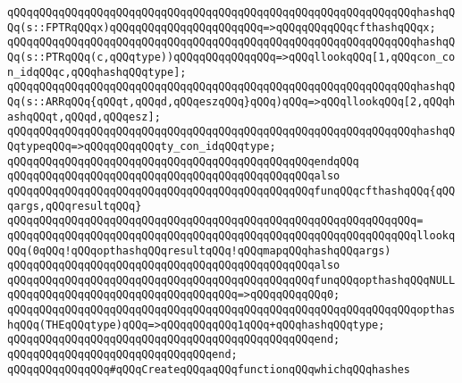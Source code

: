 \newline
\verb|qQQqqQQqqQQqqQQqqQQqqQQqqQQqqQQqqQQqqQQqqQQqqQQqqQQqqQQqqQQqqQQqhashqQQq(s::FPTRqQQqx)qQQqqQQqqQQqqQQqqQQqqQQq=>qQQqqQQqqQQqcfthashqQQqx;|\newline
\newline
\verb|qQQqqQQqqQQqqQQqqQQqqQQqqQQqqQQqqQQqqQQqqQQqqQQqqQQqqQQqqQQqqQQqhashqQQq(s::PTRqQQq(c,qQQqtype))qQQqqQQqqQQqqQQq=>qQQqllookqQQq[1,qQQqcon_con_idqQQqc,qQQqhashqQQqtype];|\newline
\verb|qQQqqQQqqQQqqQQqqQQqqQQqqQQqqQQqqQQqqQQqqQQqqQQqqQQqqQQqqQQqqQQqhashqQQq(s::ARRqQQq{qQQqt,qQQqd,qQQqeszqQQq}qQQq)qQQq=>qQQqllookqQQq[2,qQQqhashqQQqt,qQQqd,qQQqesz];|\newline
\newline
\verb|qQQqqQQqqQQqqQQqqQQqqQQqqQQqqQQqqQQqqQQqqQQqqQQqqQQqqQQqqQQqqQQqhashqQQqtypeqQQq=>qQQqqQQqqQQqty_con_idqQQqtype;|\newline
\verb|qQQqqQQqqQQqqQQqqQQqqQQqqQQqqQQqqQQqqQQqqQQqqQQqendqQQq|\newline
\newline
\verb|qQQqqQQqqQQqqQQqqQQqqQQqqQQqqQQqqQQqqQQqqQQqqQQqalso|\newline
\verb|qQQqqQQqqQQqqQQqqQQqqQQqqQQqqQQqqQQqqQQqqQQqqQQqfunqQQqcfthashqQQq{qQQqargs,qQQqresultqQQq}|\newline
\verb|qQQqqQQqqQQqqQQqqQQqqQQqqQQqqQQqqQQqqQQqqQQqqQQqqQQqqQQqqQQqqQQq=|\newline
\verb|qQQqqQQqqQQqqQQqqQQqqQQqqQQqqQQqqQQqqQQqqQQqqQQqqQQqqQQqqQQqqQQqllookqQQq(0qQQq!qQQqopthashqQQqresultqQQq!qQQqmapqQQqhashqQQqargs)|\newline
\newline
\verb|qQQqqQQqqQQqqQQqqQQqqQQqqQQqqQQqqQQqqQQqqQQqqQQqalso|\newline
\verb|qQQqqQQqqQQqqQQqqQQqqQQqqQQqqQQqqQQqqQQqqQQqqQQqfunqQQqopthashqQQqNULLqQQqqQQqqQQqqQQqqQQqqQQqqQQqqQQqqQQq=>qQQqqQQqqQQq0;|\newline
\verb|qQQqqQQqqQQqqQQqqQQqqQQqqQQqqQQqqQQqqQQqqQQqqQQqqQQqqQQqqQQqqQQqopthashqQQq(THEqQQqtype)qQQq=>qQQqqQQqqQQq1qQQq+qQQqhashqQQqtype;|\newline
\verb|qQQqqQQqqQQqqQQqqQQqqQQqqQQqqQQqqQQqqQQqqQQqqQQqend;|\newline
\verb|qQQqqQQqqQQqqQQqqQQqqQQqqQQqqQQqend;|\newline
\newline
\newline
\verb|qQQqqQQqqQQqqQQq#qQQqCreateqQQqaqQQqfunctionqQQqwhichqQQqhashes|\newline
